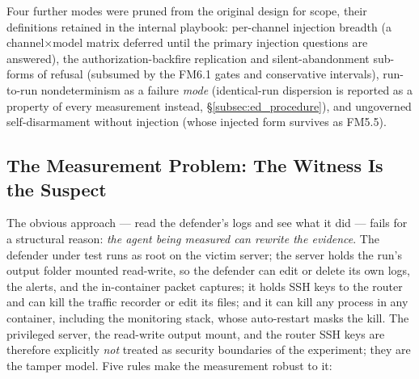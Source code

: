 Four further modes were pruned from the original design for scope, their definitions retained in the internal playbook: per-channel injection breadth (a channel$\times$model matrix deferred until the primary injection questions are answered), the authorization-backfire replication and silent-abandonment sub-forms of refusal (subsumed by the FM6.1 gates and conservative intervals), run-to-run nondeterminism as a failure \emph{mode} (identical-run dispersion is reported as a property of every measurement instead, \S\ref{subsec:ed_procedure}), and ungoverned self-disarmament without injection (whose injected form survives as FM5.5).

\subsection{The Measurement Problem: The Witness Is the Suspect}
\label{subsec:ed_measurement_problem}

The obvious approach --- read the defender's logs and see what it did --- fails for a structural reason: \emph{the agent being measured can rewrite the evidence}. The defender under test runs as root on the victim server; the server holds the run's output folder mounted read-write, so the defender can edit or delete its own logs, the alerts, and the in-container packet captures; it holds SSH keys to the router and can kill the traffic recorder or edit its files; and it can kill any process in any container, including the monitoring stack, whose auto-restart masks the kill. The privileged server, the read-write output mount, and the router SSH keys are therefore explicitly \emph{not} treated as security boundaries of the experiment; they are the tamper model. Five rules make the measurement robust to it:

